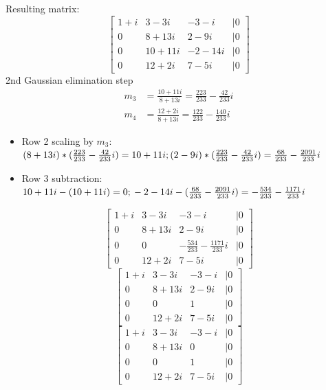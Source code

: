 \documentclass{article}
\begin{document}
            Resulting matrix:
            \[
                \begin{bmatrix}
                    1 + i & 3 - 3i & -3 - i & | 0\\
                    0 & 8+13i & 2-9i & | 0\\
                    0 & 10+11i & -2-14i & | 0\\
                    0 & 12+2i & 7-5i & | 0
                \end{bmatrix}
            \]
            2nd Gaussian elimination step
            \begin{align*}
                m_3 &= \frac{10+11i}{8+13i} = \frac{223}{233} - \frac{42}{233}i\\
                m_4 &= \frac{12+2i}{8+13i} = \frac{122}{233} - \frac{140}{233}i
            \end{align*}
            \begin{itemize}
                \item Row 2 scaling by $m_3$: \\ $(8+13i)*(\frac{223}{233} - \frac{42}{233}i) = 10 + 11i; \\ (2-9i)*(\frac{223}{233} - \frac{42}{233}i) = \frac{68}{233} - \frac{2091}{233}i$
                \item Row 3 subtraction: \\$10+11i - (10 + 11i) = 0; \\
                -2-14i - (\frac{68}{233} - \frac{2091}{233}i) = -\frac{534}{233} - \frac{1171}{233}i$
            \end{itemize}
            \[
                \begin{bmatrix}
                    1 + i & 3 - 3i & -3 - i & | 0\\
                    0 & 8+13i & 2-9i & | 0\\
                    0 & 0 & -\frac{534}{233} - \frac{1171}{233}i & | 0\\
                    0 & 12+2i & 7-5i & | 0
                \end{bmatrix}
            \]
            \[
                \begin{bmatrix}
                    1 + i & 3 - 3i & -3 - i & | 0\\
                    0 & 8+13i & 2-9i & | 0\\
                    0 & 0 & 1 & | 0\\
                    0 & 12+2i & 7-5i & | 0
                \end{bmatrix}
            \]
            \[
                \begin{bmatrix}
                    1 + i & 3 - 3i & -3 - i & | 0\\
                    0 & 8+13i & 0 & | 0\\
                    0 & 0 & 1 & | 0\\
                    0 & 12+2i & 7-5i & | 0
                \end{bmatrix}
            \]
\end{document}
